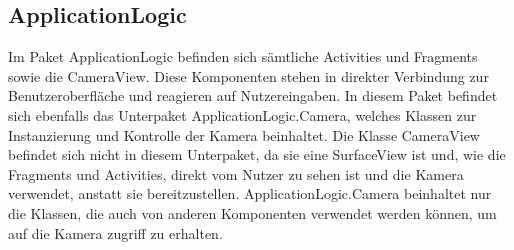 \subsection{ApplicationLogic} \label{module:applicationlogic}
Im Paket ApplicationLogic befinden sich sämtliche Activities und Fragments sowie die CameraView. Diese Komponenten stehen in direkter Verbindung zur Benutzeroberfläche und reagieren auf Nutzereingaben. In diesem Paket befindet sich ebenfalls das Unterpaket ApplicationLogic.Camera, welches Klassen zur Instanzierung und Kontrolle der Kamera beinhaltet. Die Klasse CameraView befindet sich nicht in diesem Unterpaket, da sie eine SurfaceView ist und, wie die Fragments und Activities, direkt vom Nutzer zu sehen ist und die Kamera verwendet, anstatt sie bereitzustellen. ApplicationLogic.Camera beinhaltet nur die Klassen, die auch von anderen Komponenten verwendet werden können, um auf die Kamera zugriff zu erhalten.